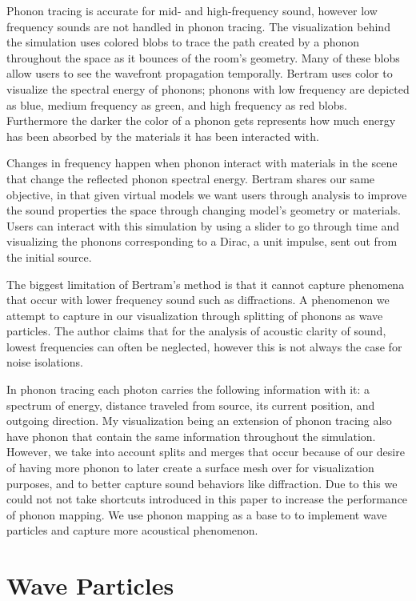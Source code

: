 \documentclass{thesis}
\begin{document}
Phonon tracing is accurate for mid- and high-frequency sound, however low frequency sounds are not handled in phonon tracing.  The visualization behind the simulation uses colored blobs to trace the path created by a phonon throughout the space as it bounces of the room’s geometry. Many of these blobs allow users to see the wavefront propagation temporally.  Bertram uses color to visualize the spectral energy of phonons; phonons with low frequency are depicted as blue, medium frequency as green, and high frequency as red blobs.  Furthermore the darker the color of a phonon gets represents how much energy has been absorbed by the materials it has been interacted with.

Changes in frequency happen when phonon interact with materials in the scene that change the reflected phonon spectral energy. Bertram shares our same objective, in that given virtual models we want users through analysis to improve the sound properties the space through changing model's geometry or materials. Users can interact with this simulation by using a slider to go through time and visualizing the phonons corresponding to a Dirac, a unit impulse,  sent out from the initial source.  

The biggest limitation of Bertram’s method is that it cannot capture phenomena that occur with lower frequency sound such as diffractions. A phenomenon we attempt to capture in our visualization through splitting of phonons as wave particles. The author claims that for the analysis of acoustic clarity of sound,  lowest frequencies can often be neglected, however this is not always the case for noise isolations.

In phonon tracing each photon carries the following information with it:  a spectrum of energy, distance traveled from source, its current position, and outgoing direction. My visualization being an extension of phonon tracing also have phonon that contain the same information throughout the simulation.  However, we take into account splits and merges that occur because of our desire of having more phonon to later create a surface mesh over for visualization purposes, and to better capture sound behaviors like diffraction. Due to this we could not not take shortcuts introduced in this paper to increase the performance of phonon mapping.  We use phonon mapping as a base to to implement wave particles and capture more acoustical phenomenon.


\section {Wave Particles} 
\end{document}
